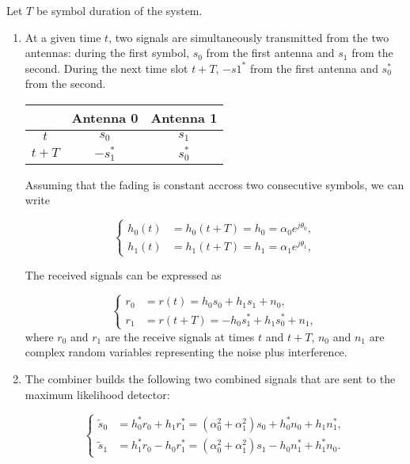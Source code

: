 \documentclass [a4paper, 11pt] {article}
\begin{document}
    \begin{solution}
      
         Let $T$ be symbol duration of the system.

\begin{enumerate}
    \item At a given time $t$, two signals are simultaneously transmitted from the two antennas: during the first symbol, $s_0$ from the first antenna and $s_1$ from the second. During the next time slot $t+T$, $-s1^*$ from the first antenna and $s_0^*$ from the second. 
    
    \begin{center}
    \begin{tabular}{ |c|c|c| } 
    \hline
     & Antenna 0 & Antenna 1 \\ 
     \hline
    $t$ & $s_0$ & $s_1$ \\ 
    \hline
    $t+T$ & $-s_1^*$ & $s_0^*$ \\ 
    \hline
    \end{tabular}
    \end{center}
    
    Assuming that the fading is constant accross two consecutive symbols, we can write 
    
    \begin{equation}
    \begin{cases}
    h_0(t) &= h_0(t+T) = h_0 = \alpha_0e^{j\theta_0},\\
    h_1(t) &= h_1(t+T) = h_1 = \alpha_1e^{j\theta_1},
    \end{cases}
    \end{equation}
    
    The received signals can be expressed as 
    
    \begin{equation}
    \begin{cases}
    r_0 &= r(t) = h_0s_0 + h_1s_1 + n_0,\\
    r_1 &= r(t+T) = -h_0s_1^* + h_1s_0^* + n_1,
    \end{cases}
    \end{equation}
    where $r_0$ and $r_1$ are the receive signals at times $t$ and $t+T$, $n_0$ and $n_1$ are complex random variables representing the noise plus interference.
    
    \item The combiner builds the following two combined signals that are sent to the maximum likelihood detector: 
    
    \begin{equation}
    \begin{cases}
    \tilde{s}_0 &= h_0^*r_0 + h_1r_1^* = (\alpha_0^2 + \alpha_1^2)s_0 + h_0^*n_0 + h_1n_1^*, \\
    \tilde{s}_1 &= h_1^*r_0 - h_0r_1^* = (\alpha_0^2 + \alpha_1^2)s_1 - h_0n_1^* + h_1^*n_0.
    \end{cases}
    \end{equation}
    

\end{enumerate}
\end{solution}
\end{document}
